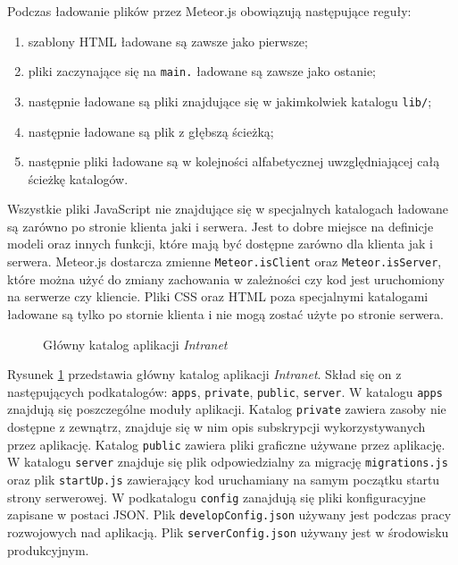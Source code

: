 Podczas ładowanie plików przez Meteor.js obowiązują następujące reguły:
\begin{enumerate}
 \item szablony HTML ładowane są zawsze jako pierwsze;
 \item pliki zaczynające się na \verb|main.| ładowane są zawsze jako ostanie;
 \item następnie ładowane są pliki znajdujące się w jakimkolwiek katalogu \verb|lib/|;
 \item następnie ładowane są plik z głębszą ścieżką;
 \item następnie pliki ładowane są w kolejności alfabetycznej uwzględniającej całą ścieżkę katalogów.
\end{enumerate}


Wszystkie pliki JavaScript nie znajdujące się w specjalnych katalogach ładowane są zarówno po stronie klienta jaki i serwera. Jest to dobre miejsce na definicje modeli oraz innych funkcji, które mają być dostępne zarówno dla klienta jak i serwera. Meteor.js dostarcza zmienne \verb|Meteor.isClient| oraz \verb|Meteor.isServer|, które można użyć do zmiany zachowania w zależności czy kod jest uruchomiony na serwerze czy kliencie. Pliki CSS oraz HTML poza specjalnymi katalogami ładowane są tylko po stornie klienta i nie mogą zostać użyte po stronie serwera.

\begin{figure}[h]
{}
  \caption{Główny katalog aplikacji \emph{Intranet}}
  \label{fig:app_main_structure}
\end{figure}

Rysunek \ref{fig:app_main_structure} przedstawia główny katalog aplikacji \emph{Intranet}. Skład się on z następujących podkatalogów: \verb|apps|, \verb|private|, \verb|public|, \verb|server|. W katalogu \verb|apps| znajdują się poszczególne moduły aplikacji. Katalog \verb|private| zawiera zasoby nie dostępne z zewnątrz, znajduje się w nim opis subskrypcji wykorzystywanych przez aplikację. Katalog \verb|public| zawiera pliki graficzne używane przez aplikację. W katalogu \verb|server| znajduje się plik odpowiedzialny za migrację \verb|migrations.js| oraz plik \verb|startUp.js| zawierający kod uruchamiany na samym początku startu strony serwerowej. W podkatalogu \verb|config| zanajdują się pliki konfiguracyjne zapisane w postaci JSON. Plik \verb|developConfig.json| używany jest podczas pracy rozwojowych nad aplikacją. Plik \verb|serverConfig.json| używany jest w środowisku produkcyjnym.

